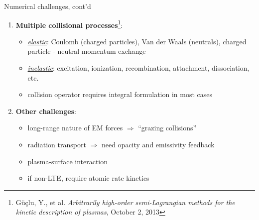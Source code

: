 \documentclass{beamer}
\begin{document}
\begin{frame}{Numerical challenges, cont'd}
\begin{enumerate}  
\item \textbf{Multiple collisional processes}\footnote{G\"{u}\c{c}lu, Y., et al. \emph{Arbitrarily high-order semi-Lagrangian methods for the kinetic description of plasmas}, October 2, 2013}:\\[0.5em]
\begin{itemize}
\item \underline{\emph{elastic}}: Coulomb (charged particles), Van der Waals (neutrals), charged particle - neutral momentum exchange\\[0.3em]
\item \underline{\emph{inelastic}}: excitation, ionization, recombination, attachment, dissociation, etc. \\[0.3em]
\item collision operator requires integral formulation in most cases\\[0.3em]
\end{itemize} 
\item \textbf{Other challenges}: \\[0.5em]

\begin{itemize}
\item long-range nature of EM forces $\Rightarrow$ ``grazing collisions''\\[0.3em]
\item radiation transport $\Rightarrow$ need opacity and emissivity feedback \\[0.3em]
\item plasma-surface interaction \\[0.3em]
\item if non-LTE, require atomic rate kinetics  \\[0.3em]
\end{itemize}
\end{enumerate}
\end{frame}

\end{document}
